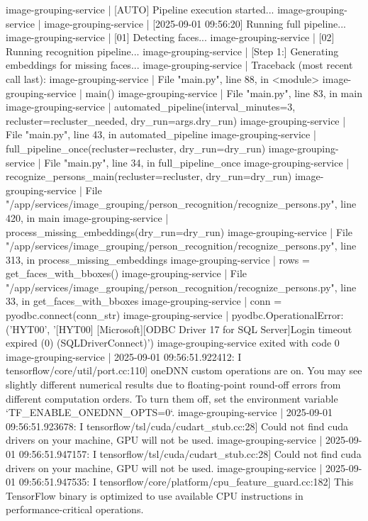 image-grouping-service  | [AUTO] Pipeline execution started...
image-grouping-service  |
image-grouping-service  | [2025-09-01 09:56:20] Running full pipeline...
image-grouping-service  | [01] Detecting faces...
image-grouping-service  | [02] Running recognition pipeline...
image-grouping-service  | [Step 1:] Generating embeddings for missing faces...
image-grouping-service  | Traceback (most recent call last):
image-grouping-service  |   File "main.py", line 88, in <module>
image-grouping-service  |     main()
image-grouping-service  |   File "main.py", line 83, in main
image-grouping-service  |     automated_pipeline(interval_minutes=3, recluster=recluster_needed, dry_run=args.dry_run)
image-grouping-service  |   File "main.py", line 43, in automated_pipeline
image-grouping-service  |     full_pipeline_once(recluster=recluster, dry_run=dry_run)
image-grouping-service  |   File "main.py", line 34, in full_pipeline_once
image-grouping-service  |     recognize_persons_main(recluster=recluster, dry_run=dry_run)
image-grouping-service  |   File "/app/services/image_grouping/person_recognition/recognize_persons.py", line 420, in main
image-grouping-service  |     process_missing_embeddings(dry_run=dry_run)
image-grouping-service  |   File "/app/services/image_grouping/person_recognition/recognize_persons.py", line 313, in process_missing_embeddings
image-grouping-service  |     rows = get_faces_with_bboxes()
image-grouping-service  |   File "/app/services/image_grouping/person_recognition/recognize_persons.py", line 33, in get_faces_with_bboxes
image-grouping-service  |     conn = pyodbc.connect(conn_str)
image-grouping-service  | pyodbc.OperationalError: ('HYT00', '[HYT00] [Microsoft][ODBC Driver 17 for SQL Server]Login timeout expired (0) (SQLDriverConnect)')
image-grouping-service exited with code 0
image-grouping-service  | 2025-09-01 09:56:51.922412: I tensorflow/core/util/port.cc:110] oneDNN custom operations are on. You may see slightly different numerical results due to floating-point round-off errors from different computation orders. To turn them off, set the environment variable `TF_ENABLE_ONEDNN_OPTS=0`.
image-grouping-service  | 2025-09-01 09:56:51.923678: I tensorflow/tsl/cuda/cudart_stub.cc:28] Could not find cuda drivers on your machine, GPU will not be used.
image-grouping-service  | 2025-09-01 09:56:51.947157: I tensorflow/tsl/cuda/cudart_stub.cc:28] Could not find cuda drivers on your machine, GPU will not be used.
image-grouping-service  | 2025-09-01 09:56:51.947535: I tensorflow/core/platform/cpu_feature_guard.cc:182] This TensorFlow binary is optimized to use available CPU instructions in performance-critical operations.
